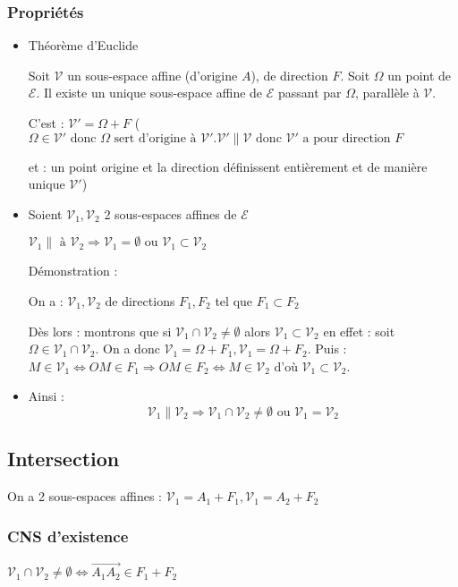 \documentclass[12pt,a4paper,french]{book}
\begin{document}
			\subsubsection{Propriétés}
				\begin{itemize}
					\item Théorème d'Euclide
					
					Soit $\mathcal{V}$ un sous-espace affine (d'origine $A$), de direction $F$. Soit $\Omega$ un point de $\mathcal{E}$. Il existe un unique sous-espace affine de $\mathcal{E}$ passant par $\Omega$, parallèle à $\mathcal{V}$.
					
					C'est : $\mathcal{V}' = \Omega + F$ ($\Omega \in \mathcal{V}' \mbox{ donc } \Omega \mbox{ sert d'origine à } \mathcal{V}'. \mathcal{V}'\parallel \mathcal{V} \mbox{ donc } \mathcal{V}' \mbox{ a pour direction } F$
					
					et : un point origine et la direction définissent entièrement et de manière unique $\mathcal{V}'$)
					\item Soient $\mathcal{V}_1,\mathcal{V}_2$ 2 sous-espaces affines de $\mathcal{E}$
					
					$\mathcal{V}_1\parallel \mbox{ à } \mathcal{V}_2 \Rightarrow \mathcal{V}_1  = \emptyset \mbox{ ou }\mathcal{V}_1 \subset \mathcal{V}_2 $
					
					Démonstration : 
					
					On a : $\mathcal{V}_1,\mathcal{V}_2$ de directions $F_1,F_2$ tel que $F_1 \subset F_2$
					
					Dès lors : montrons que si $\mathcal{V}_1 \cap\mathcal{V}_2 \neq\emptyset$ alors  $\mathcal{V}_1 \subset \mathcal{V}_2$ 
					en effet : soit $\Omega \in \mathcal{V}_1 \cap\mathcal{V}_2$. On a donc $\mathcal{V}_1  = \Omega + F_1, \mathcal{V}_1  = \Omega + F_2 $.
					Puis : $M \in \mathcal{V}_1 \Leftrightarrow OM \in F_1 \Rightarrow OM \in F_2 \Leftrightarrow M \in \mathcal{V}_2$ d'où $\mathcal{V}_1 \subset \mathcal{V}_2$.
					\item Ainsi : \[\mathcal{V}_1\parallel  \mathcal{V}_2 \Rightarrow \mathcal{V}_1 \cap\mathcal{V}_2 \neq\emptyset \mbox{ ou } \mathcal{V}_1 = \mathcal{V}_2\]
				\end{itemize}	
		\subsection{Intersection}
			On a 2 sous-espaces affines : $\mathcal{V}_1  = A_1 + F_1, \mathcal{V}_1  = A_2 + F_2 $
			\subsubsection{CNS d'existence}
				 $\mathcal{V}_1 \cap\mathcal{V}_2 \neq\emptyset \Leftrightarrow \overrightarrow{A_1 A_2} \in F_1 + F_2$
				 
\end{document}
